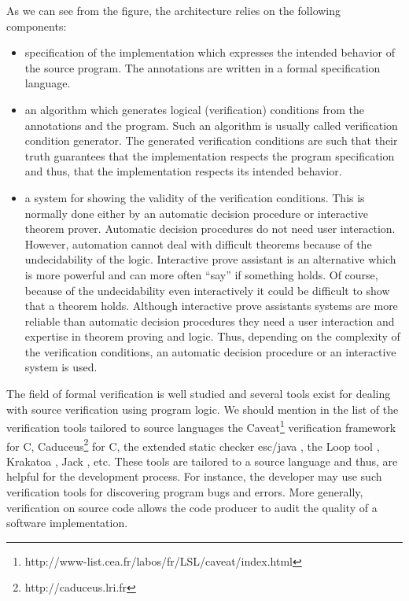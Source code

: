 As we can see from the figure, the architecture relies on the following components:
\begin{itemize} 
   \item specification of the implementation which expresses the intended behavior of the source program. The annotations
         are written in a formal specification language. 
   \item an algorithm which  generates logical (verification) conditions  from the annotations and the program.
         Such an algorithm is usually called verification condition generator. 
         The generated verification conditions are such that their truth guarantees that the implementation respects the program specification  and thus,
         that the implementation respects its intended behavior.
    
   \item a system for showing the validity of the verification conditions. This is normally done either by an automatic decision 
         procedure or interactive theorem prover.
         Automatic decision procedures do not need user interaction.
         However, automation cannot deal with difficult theorems because of the undecidability of the logic.
         Interactive prove assistant is an alternative which is 
         more powerful and can more often ``say'' if something holds. Of course, because of the undecidability 
         even  interactively it could be difficult to show that a theorem holds. Although interactive prove assistants
         systems are more reliable than automatic decision procedures they need a user interaction and expertise in theorem proving and logic. 
         Thus, depending on the complexity of the verification conditions, an automatic decision procedure or an interactive system is used.

   \end{itemize} 



 The field of formal  verification is well studied and several  tools exist for
dealing with  source verification using program logic. We should mention in the list of the verification tools tailored to source languages
the Caveat\footnote{http://www-list.cea.fr/labos/fr/LSL/caveat/index.html} verification framework  for C,
 Caduceus\footnote{http://caduceus.lri.fr} for C,  the extended static checker
esc/java \cite{escjava}, the Loop tool \cite{jacobs03java},
Krakatoa \cite{marche03krakatoa}, Jack \cite{BRL-JACK}, etc. These tools are tailored to a source language and thus,
 are helpful for the development process. For instance, the developer may use such verification tools for discovering program bugs and
 errors. More generally, verification on source code allows the code producer to audit the quality of a software implementation.
 
